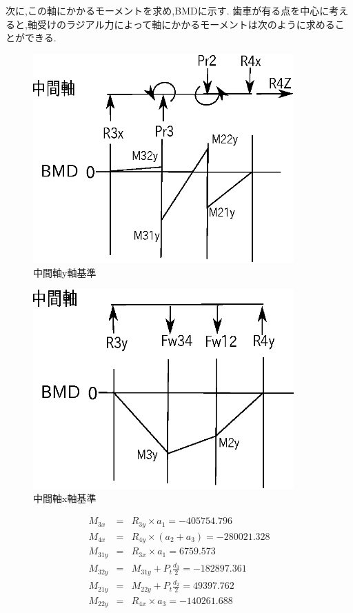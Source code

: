 次に,この軸にかかるモーメントを求め,BMDに示す.
歯車が有る点を中心に考えると,軸受けのラジアル力によって軸にかかるモーメントは次のように求めることができる.
\begin{figure}[htbp]
\begin{center}
\includegraphics[width=10cm]{../picture/jiku47.eps}
\end{center}
\caption{中間軸y軸基準}
\end{figure}
\begin{figure}[htbp]
\begin{center}
\includegraphics[width=10cm]{../picture/jiku45.eps}
\end{center}
\caption{中間軸x軸基準}
\end{figure}
\begin{eqnarray}
M_{3x} &=& R_{3y} \times a_1=-405754.796\\
M_{4x} &=& R_{4y} \times (a_2+a_3)=-280021.328\\
M_{31y} &=& R_{3x} \times a_1=6759.573\\
M_{32y} &=& M_{31y} + P_t \frac{d_3}{2}=-182897.361\\
M_{21y} &=& M_{22y} + P_t \frac{d_2}{2}=49397.762\\
M_{22y} &=& R_{4x} \times a_3=-140261.688
\end{eqnarray}
